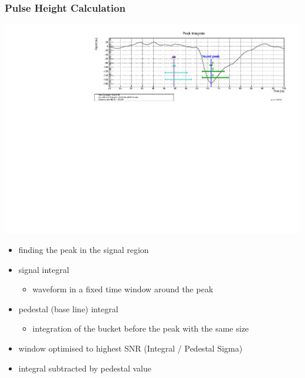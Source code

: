 \documentclass[9pt]{beamer}
\begin{document}
\begin{frame}
	\frametitle{Pulse Height Calculation}
	\begin{center}
		\includegraphics[angle=270, width=.8\textwidth]{PeakInt}\\
	\end{center}
	\begin{itemize}
		\setlength{\itemsep}{\fill}
		\item finding the peak in the signal region
		\item signal integral
		\begin{itemize}
			\item waveform in a fixed time window around the peak
		\end{itemize}
		\item pedestal (base line) integral
		\begin{itemize}
			\item integration of the bucket before the peak with the same size
		\end{itemize}
		\item window optimised to highest SNR (Integral / Pedestal Sigma)
		\item integral subtracted by pedestal value 
	\end{itemize}
\end{frame}
\end{document}
